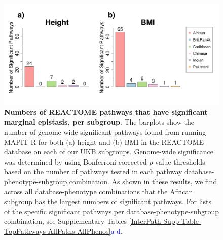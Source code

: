 \documentclass[10pt,a4paper]{article}
\begin{document}
\begin{figure}[htbp]
\centering
\hspace*{-.9cm}
\includegraphics[scale=.45]{Images/Supp/InterPath_Supp_Figure_Barplots_REACTOME_vs4.png}
\caption[TBD]{\textbf{Numbers of REACTOME pathways that have significant marginal epistasis, per subgroup}. The barplots show the number of genome-wide significant pathways found from running MAPIT-R for both (a) height and (b) BMI in the REACTOME database on each of our UKB subgroups. Genome-wide significance was determined by using Bonferroni-corrected $p$-value thresholds based on the number of pathways tested in each pathway database-phenotype-subgroup combination. As shown in these results, we find across all database-phenotype combinations that the African subgroup has the largest numbers of significant pathways. For lists of the specific significant pathways per database-phenotype-subgroup combination, see Supplementary Tables \ref{InterPath-Supp-Table-TopPathways-AllPaths-AllPhenos}\textcolor{blue}{a-d}.}
\label{InterPath-Supp-Figure-Barplots-REACTOME}
\end{figure}
\clearpage
\end{document}
